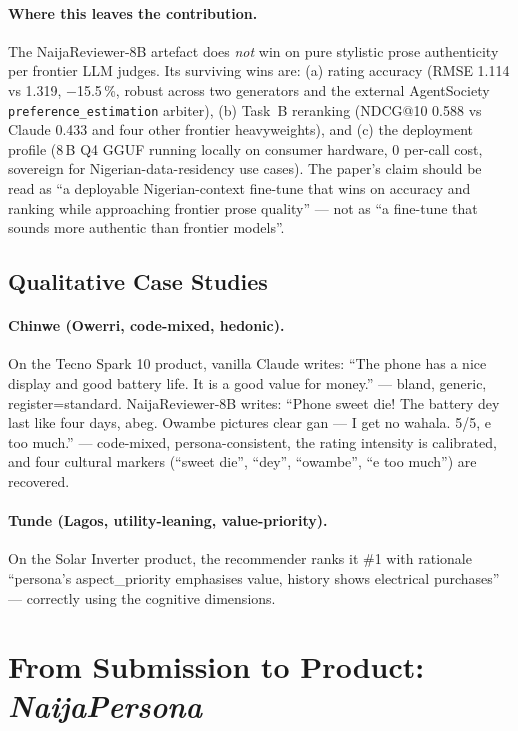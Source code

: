 \documentclass[sigconf,nonacm,balance]{acmart}
\begin{document}
\paragraph{Where this leaves the contribution.} The NaijaReviewer-8B
artefact does \emph{not} win on pure stylistic prose authenticity per
frontier LLM judges. Its surviving wins are: (a) rating accuracy
(RMSE 1.114 vs 1.319, $-$15.5\,\%, robust across two generators and the
external AgentSociety \texttt{preference\_estimation} arbiter), (b) Task~B
reranking (NDCG@10 0.588 vs Claude 0.433 and four other frontier
heavyweights), and (c) the deployment profile (8\,B Q4 GGUF running
locally on consumer hardware, $0$ per-call cost, sovereign for
Nigerian-data-residency use cases). The paper's claim should be read
as ``a deployable Nigerian-context fine-tune that wins on accuracy and
ranking while approaching frontier prose quality'' --- not as ``a
fine-tune that sounds more authentic than frontier models''.

\subsection{Qualitative Case Studies}

\paragraph{Chinwe (Owerri, code-mixed, hedonic).}
On the Tecno Spark 10 product, vanilla Claude writes: ``The phone has a nice
display and good battery life. It is a good value for money.'' --- bland,
generic, register=standard. NaijaReviewer-8B writes: ``Phone sweet die! The
battery dey last like four days, abeg. Owambe pictures clear gan --- I get
no wahala. 5/5, e too much.'' --- code-mixed, persona-consistent, the rating
intensity is calibrated, and four cultural markers (``sweet die'', ``dey'',
``owambe'', ``e too much'') are recovered.

\paragraph{Tunde (Lagos, utility-leaning, value-priority).}
On the Solar Inverter product, the recommender ranks it \#1 with rationale
``persona's aspect\_priority emphasises value, history shows electrical
purchases'' --- correctly using the cognitive dimensions.

\section{From Submission to Product: \emph{NaijaPersona}}
\label{sec:product}
\end{document}
